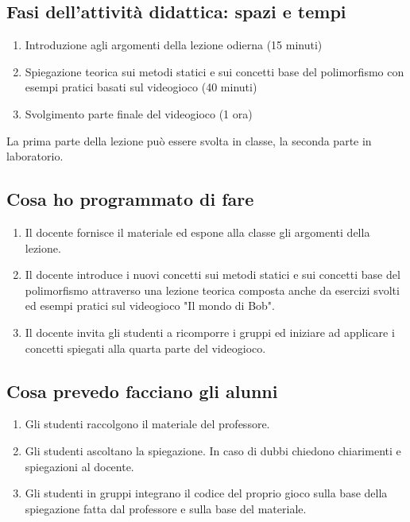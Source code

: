 \documentclass[12pt,a4paper]{article}
\begin{document}
\subsection*{Fasi dell'attività didattica: spazi e tempi}

\begin{enumerate}
\item Introduzione agli argomenti della lezione odierna (15 minuti)
\item Spiegazione teorica sui metodi statici e sui concetti base del polimorfismo con esempi pratici basati sul videogioco (40 minuti)
\item Svolgimento parte finale del videogioco (1 ora)


\end{enumerate}
La prima parte della lezione può essere svolta in classe, la seconda parte in laboratorio.

\subsection*{Cosa ho programmato di fare}
\begin{enumerate}
	\item Il docente fornisce il materiale ed espone alla classe gli argomenti della lezione.
\item Il docente introduce i nuovi concetti sui metodi statici e sui concetti base del polimorfismo attraverso una lezione teorica composta anche da esercizi svolti ed esempi pratici sul videogioco "Il mondo di Bob".
\item Il docente invita gli studenti a ricomporre i gruppi ed iniziare ad applicare i concetti spiegati alla quarta parte del videogioco.


\end{enumerate}
\subsection*{Cosa prevedo facciano gli alunni}

\begin{enumerate}
\item Gli studenti raccolgono il materiale del professore. 
\item Gli studenti ascoltano la spiegazione. In caso di dubbi chiedono chiarimenti e spiegazioni al docente.
\item Gli studenti in gruppi integrano il codice del proprio gioco sulla base della spiegazione fatta dal professore e sulla base del materiale.


\end{enumerate}
\end{document}
